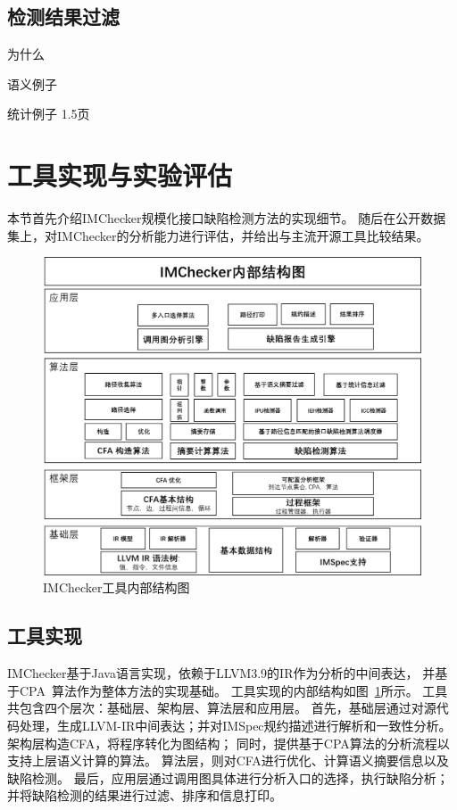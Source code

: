 %


\subsection{检测结果过滤}
为什么

语义例子

统计例子
1.5页
\section{工具实现与实验评估}
\label{sec:3.4}
本节首先介绍IMChecker规模化接口缺陷检测方法的实现细节。
随后在公开数据集上，对IMChecker的分析能力进行评估，并给出与主流开源工具比较结果。

\begin{figure}[t]
	\centering
	\includegraphics[width=0.9\linewidth]{figures/cp3-implementation.png}
	\caption{
		IMChecker工具内部结构图
	}
	\label{fig:3-4-implementation}
\end{figure}

\subsection{工具实现}
IMChecker基于Java语言实现，依赖于LLVM3.9的IR作为分析的中间表达，
并基于CPA~\cite{07-cav-cpachecker}算法作为整体方法的实现基础。
工具实现的内部结构如图~\ref{fig:3-4-implementation}所示。
工具共包含四个层次：基础层、架构层、算法层和应用层。
首先，基础层通过对源代码处理，生成LLVM-IR中间表达；并对IMSpec规约描述进行解析和一致性分析。
架构层构造CFA，将程序转化为图结构；
同时，提供基于CPA算法的分析流程以支持上层语义计算的算法。
算法层，则对CFA进行优化、计算语义摘要信息以及缺陷检测。
最后，应用层通过调用图具体进行分析入口的选择，执行缺陷分析；
并将缺陷检测的结果进行过滤、排序和信息打印。

